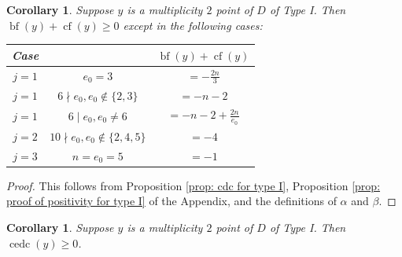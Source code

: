 \documentclass[12pt]{amsart}
\numberwithin{equation}{section}
\newtheorem{corollary}[equation]{Corollary}
\theoremstyle{definition}
\DeclareMathOperator{\blf}{bf}
\DeclareMathOperator{\cf}{cf}
\DeclareMathOperator{\cedc}{cedc}
\begin{document}
\begin{corollary}\label{cor: first positivity for type I}
    Suppose $y$ is a multiplicity $2$ point of $D$ of Type I. Then $\blf(y)+\cf(y)\geq0$ except in the following cases:
    \begin{table}[h!]
    \centering
    \renewcommand{\arraystretch}{1.4}
    \begin{tabular}{|cc|c|}
        \hline
         \textbf{\textup{Case}} &  & $\blf(y)+\cf(y)$ \\
        \hline
        $j=1$ & $e_0= 3$ & $=-\frac{2n}{3}$ \\
        \hline
        $j=1$ & $6\nmid e_0, e_0\not\in\{2,3\}$ & $=-n-2$ \\
        \hline
        $j=1$ & $6\mid e_0, e_0\neq 6$ & $=-n-2+\frac{2n}{e_0}$ \\
        \hline
        $j=2$ & $10\nmid e_0,e_0\not\in\{2,4,5\}$ & $=-4$ \\
        \hline
        $j=3$ & $n=e_0=5$ & $=-1$ \\
        \hline
    \end{tabular}
    \end{table}
    
\end{corollary}
\begin{proof}
    This follows from Proposition \ref{prop: cdc for type I}, Proposition \ref{prop: proof of positivity for type I} of the Appendix, and the definitions of $\alpha$ and $\beta$.
\end{proof}

\begin{corollary}\label{cor: cedc positivity for type I}
    Suppose $y$ is a multiplicity $2$ point of $D$ of Type I. Then $\cedc(y)\geq0$.
\end{corollary}
\end{document}
